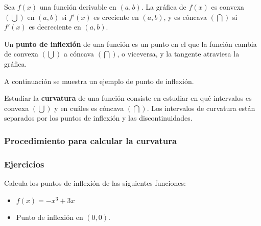 Sea $f(x)$ una función derivable en $(a,b)$. La gráfica de $f(x)$ es convexa $(\bigcup)$ en $(a,b)$ si $f'(x)$ es creciente en $(a,b)$, y es cóncava $(\bigcap)$ si $f'(x)$ es decreciente en $(a,b)$.\\
\begin{definition}
Un \textbf{punto de inflexión} de una función es un punto en el que la función cambia de convexa $(\bigcup)$ a cóncava $(\bigcap)$, o viceversa, y la tangente atraviesa la gráfica.
\end{definition}
A continuación se muestra un ejemplo de punto de inflexión.


\begin{definition}
Estudiar la \textbf{curvatura} de una función consiste en estudiar en qué intervalos es convexa $(\bigcup)$ y en cuáles es cóncava $(\bigcap)$. Los intervalos de curvatura están separados por los puntos de inflexión y las discontinuidades.
\end{definition}

\subsubsection{Procedimiento para calcular la curvatura}
\subsubsection{Ejercicios}
\begin{ex}
	Calcula los puntos de inflexión de las siguientes funciones:\\
	\begin{itemize}
		\item $f(x)=-x^3+3x$
	\end{itemize}
	\begin{sol}
		\begin{itemize}
			\item Punto de inflexión en $(0,0)$.
		\end{itemize}
	\end{sol}
\end{ex}



